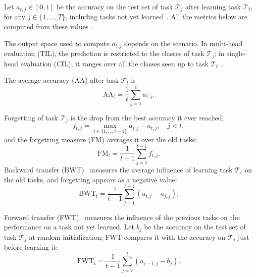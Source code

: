 Let $a_{t,j} \in [0,1]$ be the accuracy on the test set of task $\mathcal{T}_j$ after learning task $\mathcal{T}_t$, for any $j \in \{1,\dots,T\}$, including tasks not yet learned~\cite{lopez2017gem}.
All the metrics below are computed from these values~\cite{Wang2024tpami_cl}.

The output space used to compute $a_{t,j}$ depends on the scenario.
In multi-head evaluation (TIL), the prediction is restricted to the classes of task $\mathcal{T}_j$; in single-head evaluation (CIL), it ranges over all the classes seen up to task $\mathcal{T}_t$~\cite{Wang2024tpami_cl}.

The average accuracy (AA) after task $\mathcal{T}_t$ is
\begin{equation}
    \mathrm{AA}_t = \frac{1}{t}\sum_{j=1}^{t} a_{t,j}.
\end{equation}

Forgetting of task $\mathcal{T}_j$ is the drop from the best accuracy it ever reached,
\begin{equation}
    f_{t,j} = \max_{i \in \{1,\dots,t-1\}} a_{i,j} - a_{t,j}, \quad j < t,
\end{equation}
and the forgetting measure (FM) averages it over the old tasks:
\begin{equation}
    \mathrm{FM}_t = \frac{1}{t-1}\sum_{j=1}^{t-1} f_{t,j}.
\end{equation}
Backward transfer (BWT)~\cite{lopez2017gem} measures the average influence of learning task $\mathcal{T}_t$ on the old tasks, and forgetting appears as a negative value:
\begin{equation}
    \mathrm{BWT}_t = \frac{1}{t-1}\sum_{j=1}^{t-1} \left(a_{t,j} - a_{j,j}\right).
\end{equation}

Forward transfer (FWT)~\cite{lopez2017gem} measures the influence of the previous tasks on the performance on a task not yet learned.
Let $b_j$ be the accuracy on the test set of task $\mathcal{T}_j$ at random initialization; FWT compares it with the accuracy on $\mathcal{T}_j$ just before learning it:
\begin{equation}
    \mathrm{FWT}_t = \frac{1}{t-1}\sum_{j=2}^{t} \left(a_{j-1,j} - b_j\right).
\end{equation}
